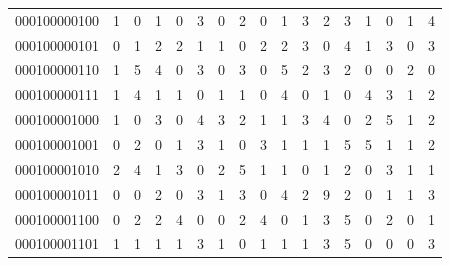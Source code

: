\documentclass[10pt,a4paper]{article}
\begin{document}
\begin{longtable}{ |c|c|c|c|c|c|c|c|c|c|c|c|c|c|c|c|c| }
    000100000100              & 1                            & 0                                & 1                            & 0                              & 3   & 0   & 2   & 0   & 1   & 3   & 2   & 3   & 1   & 0   & 1   & 4   \\
    000100000101              & 0                            & 1                                & 2                            & 2                              & 1   & 1   & 0   & 2   & 2   & 3   & 0   & 4   & 1   & 3   & 0   & 3   \\
    000100000110              & 1                            & 5                                & 4                            & 0                              & 3   & 0   & 3   & 0   & 5   & 2   & 3   & 2   & 0   & 0   & 2   & 0   \\
    000100000111              & 1                            & 4                                & 1                            & 1                              & 0   & 1   & 1   & 0   & 4   & 0   & 1   & 0   & 4   & 3   & 1   & 2   \\
    000100001000              & 1                            & 0                                & 3                            & 0                              & 4   & 3   & 2   & 1   & 1   & 3   & 4   & 0   & 2   & 5   & 1   & 2   \\
    000100001001              & 0                            & 2                                & 0                            & 1                              & 3   & 1   & 0   & 3   & 1   & 1   & 1   & 5   & 5   & 1   & 1   & 2   \\
    000100001010              & 2                            & 4                                & 1                            & 3                              & 0   & 2   & 5   & 1   & 1   & 0   & 1   & 2   & 0   & 3   & 1   & 1   \\
    000100001011              & 0                            & 0                                & 2                            & 0                              & 3   & 1   & 3   & 0   & 4   & 2   & 9   & 2   & 0   & 1   & 1   & 3   \\
    000100001100              & 0                            & 2                                & 2                            & 4                              & 0   & 0   & 2   & 4   & 0   & 1   & 3   & 5   & 0   & 2   & 0   & 1   \\
    000100001101              & 1                            & 1                                & 1                            & 1                              & 3   & 1   & 0   & 1   & 1   & 1   & 3   & 5   & 0   & 0   & 0   & 3   \\

\end{longtable}
\end{document}
